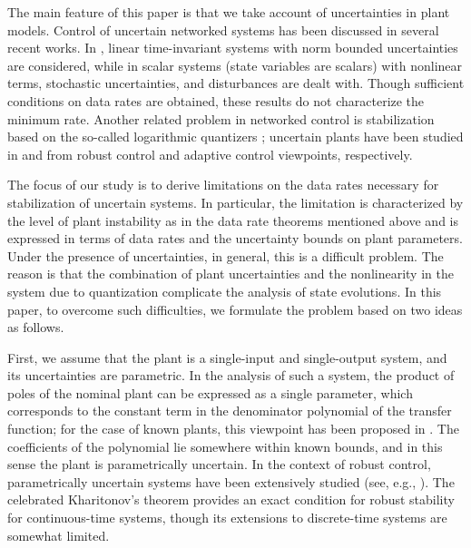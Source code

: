 \documentclass[a4paper, 11pt]{article}
\theoremstyle{definition}
\begin{document}
The main feature of this paper is that we take account of uncertainties in
plant models.
Control of uncertain networked systems has been discussed in several recent
works.
In \cite{Phat2004}, linear time-invariant systems with norm bounded
uncertainties are considered, while in \cite{Martins2006} scalar systems
(state variables are scalars) with nonlinear terms, stochastic
uncertainties, and disturbances are dealt with.
Though sufficient conditions on data rates are obtained, these results
do not characterize the minimum rate.
Another related problem in networked control is stabilization based on
the so-called logarithmic quantizers \cite{Elia2001, Fu2005, Tsumura2009};
uncertain plants have been studied in \cite{Fu2010} and \cite{Hayakawa2009}
from robust control and adaptive control viewpoints, respectively.

The focus of our study is to derive limitations on the data rates necessary
for stabilization of uncertain systems. In particular, the limitation is characterized by the level of plant instability
as in the data rate theorems mentioned above and is expressed in terms
of data rates and the uncertainty bounds on
plant parameters.
Under the presence of uncertainties, in general, this is a difficult problem.
The reason is that the combination of plant uncertainties and the nonlinearity
in the system due to quantization complicate the analysis of state evolutions.
In this paper, to overcome such difficulties, we formulate the problem
based on two ideas as follows.

First, we assume that the plant is a single-input and single-output system,
and its uncertainties are parametric.
In the analysis of such a system, the product of poles of the nominal plant
can be expressed as a single parameter, which corresponds to the constant
term in the denominator polynomial of the transfer function;
for the case of known plants, this viewpoint has been proposed in \cite{You2010}.
The coefficients of the polynomial lie somewhere within known bounds, and in this sense
the plant is parametrically uncertain.
In the context of robust control, parametrically uncertain systems have
been extensively studied (see, e.g., \cite{Barmish1994, Bhattacharyya1995}).
The celebrated Kharitonov's theorem \cite{Kharitonov1979} provides an exact
condition for robust stability for continuous-time systems,
though its extensions to discrete-time systems are somewhat limited.
\end{document}
